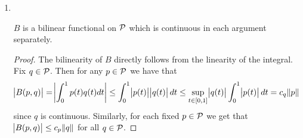 \begin{enumerate}[label = \textbf{Exercise \arabic*.},wide = 0pt, itemsep = 1.5ex]
\begin{enumerate}[label = \textbf{\alph*.},wide = 0pt, itemsep = 1.5ex]
				\begin{lemma}
					Equip $X \times X$ with the norm $\norm{(x,y)} := \norm{x} + \norm{y}$. Then $B$ is continuous.
				\end{lemma}

				\begin{proof}
					Let $(x,y) \in X \times X$ and $(x_n,y_n)_{n \in \Nbb}$ be a sequence in $X \times X$ converging to $(x,y)$. We claim that $x_n \to x$ and $y_n \to y$ in $X$. Indeed
					\begin{equation*}
						\norm{x_n - x} \leq \norm{x_n - x} + \norm{y_n - y} = \norm{(x_n,y_n) - (x,y)} \to 0
					\end{equation*}
					\noindent as $n \to \infty$ and similarly
					\begin{equation*}
						\norm{y_n - y} \leq \norm{x_n - x} + \norm{y_n - y} = \norm{(x_n,y_n) - (x,y)} \to 0.
					\end{equation*}
					Moreover, since $y_n \to y$, $y_n$ is bounded, i.e. there exists some $M \geq 0$ such that $\norm{y_n} \leq M$ for all $n \in \Nbb$. Hence
					\begin{align*}
						\abs{B(x_n,y_n) - B(x,y)} &= \abs{B(x_n,y_n) - B(x,y_n) + B(x,y_n) - B(x,y)}\\
						&= \abs{B(x_n - x,y_n) + B(x,y_n - y)}\\
						&\leq \abs{B(x_n - x,y_n)} + \abs{B(x,y_n - y)}\\
						&\leq c \norm{x_n - x}\norm{y_n} + c \norm{x}\norm{y_n - y}\\
						&\leq cM \norm{x_n - x} + c\norm{x}\norm{y_n - y} \rightarrow 0
					\end{align*}
					\noindent as $n \to \infty$.
				\end{proof}
			\item
				~
				\begin{lemma}
					$B$ is a bilinear functional on $\cal{P}$ which is continuous in each argument separately.
				\end{lemma}

				\begin{proof}
					The bilinearity of $B$ directly follows from the linearity of the integral. Fix $q \in \cal{P}$. Then for any $p \in \cal{P}$ we have that
					\begin{equation*}
						\abs{B(p,q)} = \abs[3]{\int_0^1 p(t)q(t)dt} \leq \int_0^1 \abs{p(t)}\abs{q(t)}dt \leq \sup_{t \in \intcc{0,1}}\abs{q(t)} \int_0^1 \abs{p(t)}dt = c_q \norm{p}
					\end{equation*}
					\noindent since $q$ is continuous. Similarly, for each fixed $p \in \cal{P}$ we get that $\abs{B(p,q)} \leq c_p \norm{q}$ for all $q \in \cal{P}$.
				\end{proof}
		\end{enumerate}
\end{enumerate}


